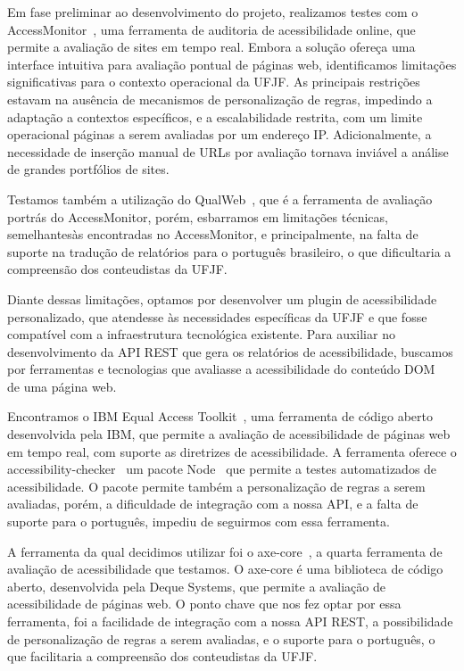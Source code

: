 \documentclass[12pt]{article}
\begin{document}
Em fase preliminar ao desenvolvimento do projeto, realizamos testes com o
AccessMonitor~\autocite{AM},
uma ferramenta de auditoria de acessibilidade online, que permite a avaliação de
sites em tempo real. Embora a solução ofereça uma interface intuitiva para
avaliação pontual de páginas web, identificamos limitações significativas para o
contexto operacional da UFJF. As principais restrições estavam na ausência de
mecanismos de personalização de regras, impedindo a adaptação a contextos
específicos, e a escalabilidade restrita, com um limite operacional páginas a
serem avaliadas por um endereço IP\@. Adicionalmente, a necessidade de inserção
manual de URLs por avaliação tornava inviável a análise de grandes portfólios de
sites\@.

Testamos também a utilização do QualWeb~\autocite{qualweb}, que é a ferramenta
de avaliação portrás do AccessMonitor, porém, esbarramos em limitações técnicas,
semelhantesàs encontradas no AccessMonitor, e principalmente, na falta de suporte
na tradução de relatórios para o português brasileiro, o que dificultaria a compreensão dos
conteudistas da UFJF\@.

Diante dessas limitações, optamos por desenvolver um plugin de acessibilidade
personalizado, que atendesse às necessidades específicas da UFJF e que fosse
compatível com a infraestrutura tecnológica existente. Para auxiliar no
desenvolvimento da API REST que gera os relatórios de acessibilidade,
buscamos por ferramentas e tecnologias que avaliasse a acessibilidade
do conteúdo DOM~\autocite{DOM} de uma página web.

Encontramos o IBM Equal Access Toolkit~\autocite{IBMa}, uma ferramenta de código
aberto desenvolvida pela IBM, que permite a avaliação de acessibilidade de páginas
web em tempo real, com suporte as diretrizes de acessibilidade. A ferramenta oferece
o accessibility-checker~\autocite{AC} um pacote Node~\autocite{Node} que permite a
testes automatizados de acessibilidade. O pacote permite também a personalização de
regras a serem avaliadas,
porém, a dificuldade de integração com a nossa API, e a falta de suporte para o
português, impediu de seguirmos com essa ferramenta.

A ferramenta da qual decidimos utilizar foi o axe-core~\autocite{axecore}, a quarta
ferramenta de avaliação de acessibilidade que testamos. O axe-core é uma biblioteca
de código aberto, desenvolvida pela Deque Systems, que permite a avaliação de acessibilidade
de páginas web. O ponto chave que nos fez optar por essa ferramenta, foi a facilidade
de integração com a nossa API REST, a possibilidade de personalização de regras a serem
avaliadas, e o suporte para o português, o que facilitaria a compreensão dos conteudistas
da UFJF\@.
\end{document}
